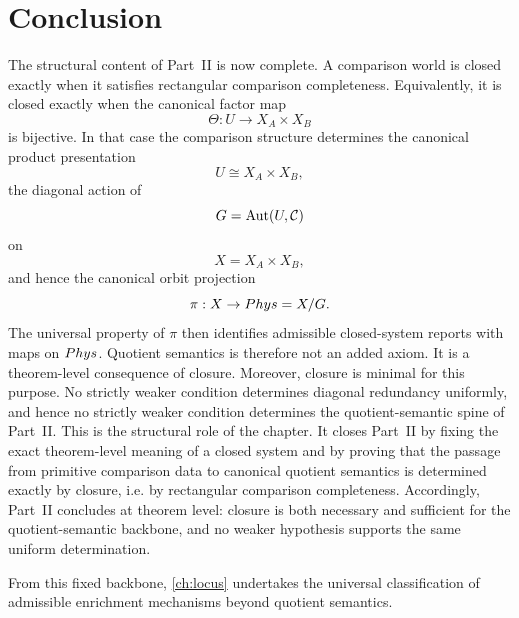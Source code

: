 \section{Conclusion}
\label{sec:closure-conclusion}
The structural content of Part~II is now complete.
A comparison world is closed exactly when it satisfies rectangular
comparison completeness. Equivalently, it is closed exactly when the
canonical factor map
\[
	\Theta:U\to X_A\times X_B
\]
is bijective. In that case the comparison structure determines the canonical
product presentation
\[
	U\cong X_A\times X_B,
\]
the diagonal action of
\[
	G=\operatorname{Aut}(U,\mathcal C)
\]
on
\[
	X=X_A\times X_B,
\]
and hence the canonical orbit projection
\[
	\pi:X\to Phys=X/G.
\]
The universal property of \(\pi\) then identifies admissible
closed-system reports with maps on \(Phys\). Quotient semantics is
therefore not an added axiom. It is a theorem-level consequence of
closure.
	Moreover, closure is minimal for this purpose. No strictly weaker
	condition determines diagonal redundancy uniformly, and hence no strictly
	weaker condition determines the quotient-semantic spine of Part~II.
	This is the structural role of the chapter. It closes Part~II by fixing
	the exact theorem-level meaning of a closed system and by proving that
	the passage from primitive comparison data to canonical quotient
	semantics is determined exactly by closure, i.e. by rectangular
	comparison completeness.
	Accordingly, Part~II concludes at theorem level: closure is both
	necessary and sufficient for the quotient-semantic backbone, and no
	weaker hypothesis supports the same uniform determination.

From this fixed backbone, \cref{ch:locus} undertakes the universal
classification of admissible enrichment mechanisms beyond quotient
semantics.

\begin{chapterclosing}
\end{chapterclosing}
